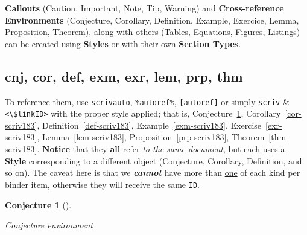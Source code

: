 \documentclass[
  12pt,
  a4paper,
  oneside,
  titlepage,
  toclink=all,
  toc=bibliography]{scrbook}
\theoremstyle{plain}
\theoremstyle{definition}
\theoremstyle{definition}
\theoremstyle{plain}
\theoremstyle{plain}
\newtheorem{conjecture}{Conjecture}[section]
\theoremstyle{plain}
\theoremstyle{definition}
\theoremstyle{plain}
\theoremstyle{remark}
\begin{document}
\begin{tcolorbox}[enhanced jigsaw, breakable, opacitybacktitle=0.6, colframe=quarto-callout-tip-color-frame, opacityback=0, arc=.35mm, left=2mm, bottomtitle=1mm, toptitle=1mm, toprule=.15mm, titlerule=0mm, coltitle=black, colbacktitle=quarto-callout-tip-color!10!white, title=\textcolor{quarto-callout-tip-color}{\faLightbulb}\hspace{0.5em}{Tip}, colback=white, rightrule=.15mm, bottomrule=.15mm, leftrule=.75mm]

\textbf{Callouts} (Caution, Important, Note, Tip, Warning) and
\textbf{Cross-reference Environments} (Conjecture, Corollary,
Definition, Example, Exercice, Lemma, Proposition, Theorem), along with
others (Tables, Equations, Figures, Listings) can be created using
\textbf{Styles} or with their own \textbf{Section Types}.

\end{tcolorbox}

\hypertarget{sec-scriv183}{%
\subsection{cnj, cor, def, exm, exr, lem, prp, thm}\label{sec-scriv183}}

\protect\hypertarget{scriv183}{}{}

To reference them, use \texttt{scrivautο}, \texttt{\%autοref\%},
\texttt{{[}autοref{]}} or simply \texttt{scriv} \&
\texttt{\textless{}\textbackslash{}\$linkID\textgreater{}} with the
proper style applied; that is,
\protect\hypertarget{cite_39}{}{\label{cite_39}Conjecture~\ref{cnj-scriv183}},
\protect\hypertarget{cite_40}{}{\label{cite_40}Corollary~\ref{cor-scriv183}},
\protect\hypertarget{cite_41}{}{\label{cite_41}Definition~\ref{def-scriv183}},
\protect\hypertarget{cite_42}{}{\label{cite_42}Example~\ref{exm-scriv183}},
\protect\hypertarget{cite_43}{}{\label{cite_43}Exercise~\ref{exr-scriv183}},
\protect\hypertarget{cite_44}{}{\label{cite_44}Lemma~\ref{lem-scriv183}},
\protect\hypertarget{cite_45}{}{\label{cite_45}Proposition~\ref{prp-scriv183}},
\protect\hypertarget{cite_46}{}{\label{cite_46}Theorem~\ref{thm-scriv183}}.
\textbf{Notice} that they \textbf{all} refer \emph{to the same
document}, but each uses a \textbf{Style} corresponding to a different
object (Conjecture, Corollary, Definition, and so on). The caveat here
is that we \textbf{\emph{cannot}} have more than \ul{one} of each kind
per binder item, otherwise they will receive the same \texttt{ID}.

\begin{conjecture}[]\protect\hypertarget{cnj-scriv183}{}\label{cnj-scriv183}

Conjecture environment

\end{conjecture}
\end{document}
